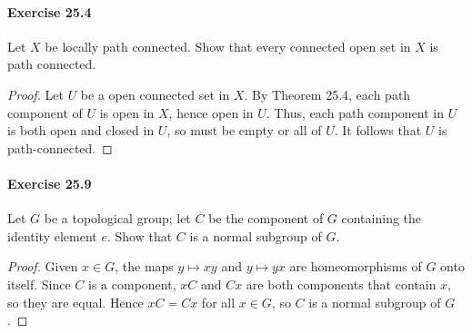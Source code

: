 \documentclass{article}
\begin{document}
\paragraph{Exercise 25.4} Let $X$ be locally path connected. Show that every connected open set in $X$ is path connected.
\begin{proof}
    Let $U$ be a open connected set in $X$. By Theorem 25.4, each path component of $U$ is open in $X$, hence open in $U$. Thus, each path component in $U$ is both open and closed in $U$, so must be empty or all of $U$. It follows that $U$ is path-connected.
\end{proof}



\paragraph{Exercise 25.9} Let $G$ be a topological group; let $C$ be the component of $G$ containing the identity element $e$. Show that $C$ is a normal subgroup of $G$.
\begin{proof}
    Given $x \in G$, the maps $y \mapsto x y$ and $y \mapsto y x$ are homeomorphisms of $G$ onto itself. Since $C$ is a component, $x C$ and $C x$ are both components that contain $x$, so they are equal. Hence $x C=C x$ for all $x \in G$, so $C$ is a normal subgroup of $G$.
\end{proof}
\end{document}
